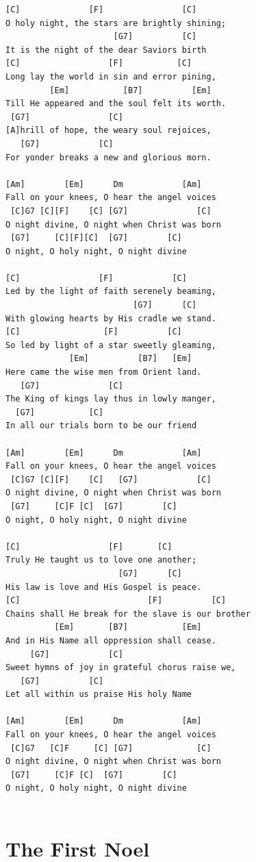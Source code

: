 \documentclass[
]{book}
\let\stdsection\section
\renewcommand\section{\clearpage\stdsection}
\begin{document}
\begin{verbatim}
[C]              [F]                [C]
O holy night, the stars are brightly shining;
                      [G7]          [C]
It is the night of the dear Saviors birth
[C]                  [F]           [C]
Long lay the world in sin and error pining,
         [Em]           [B7]          [Em]
Till He appeared and the soul felt its worth.
 [G7]                [C]           
[A]hrill of hope, the weary soul rejoices,
   [G7]            [C]               
For yonder breaks a new and glorious morn.

[Am]        [Em]      Dm            [Am]
Fall on your knees, O hear the angel voices
 [C]G7 [C][F]    [C] [G7]              [C]
O night divine, O night when Christ was born
 [G7]     [C][F][C]  [G7]        [C]
O night, O holy night, O night divine

[C]                [F]            [C]
Led by the light of faith serenely beaming,
                          [G7]      [C]
With glowing hearts by His cradle we stand.
[C]                 [F]          [C]
So led by light of a star sweetly gleaming,
             [Em]          [B7]   [Em]
Here came the wise men from Orient land.
   [G7]              [C]
The King of kings lay thus in lowly manger,
  [G7]           [C]
In all our trials born to be our friend

[Am]        [Em]      Dm            [Am]
Fall on your knees, O hear the angel voices
 [C]G7 [C][F]    [C]   [G7]            [C]
O night divine, O night when Christ was born
 [G7]     [C]F [C]  [G7]        [C]
O night, O holy night, O night divine

[C]                  [F]       [C]
Truly He taught us to love one another;
                       [G7]      [C]
His law is love and His Gospel is peace.
[C]                          [F]          [C]
Chains shall He break for the slave is our brother
          [Em]       [B7]           [Em]
And in His Name all oppression shall cease.
     [G7]            [C]
Sweet hymns of joy in grateful chorus raise we,
   [G7]          [C]
Let all within us praise His holy Name

[Am]        [Em]      Dm            [Am]
Fall on your knees, O hear the angel voices
 [C]G7   [C]F     [C] [G7]             [C]
O night divine, O night when Christ was born
 [G7]     [C]F [C]  [G7]        [C]
O night, O holy night, O night divine


\end{verbatim}

\hypertarget{weihnachten-the-first-noel}{%
\section{The First Noel}\label{weihnachten-the-first-noel}}
\end{document}
